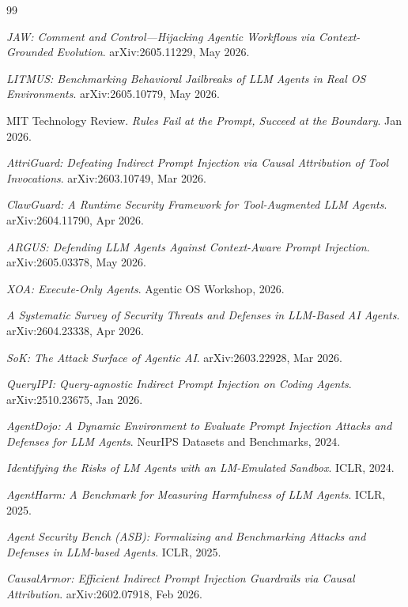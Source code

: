 \documentclass{article}
\begin{document}

\begin{thebibliography}{99}

\textit{JAW: Comment and Control---Hijacking Agentic Workflows via Context-Grounded Evolution}. arXiv:2605.11229, May 2026.

\textit{LITMUS: Benchmarking Behavioral Jailbreaks of LLM Agents in Real OS Environments}. arXiv:2605.10779, May 2026.

MIT Technology Review. \textit{Rules Fail at the Prompt, Succeed at the Boundary}. Jan 2026.

\textit{AttriGuard: Defeating Indirect Prompt Injection via Causal Attribution of Tool Invocations}. arXiv:2603.10749, Mar 2026.

\textit{ClawGuard: A Runtime Security Framework for Tool-Augmented LLM Agents}. arXiv:2604.11790, Apr 2026.

\textit{ARGUS: Defending LLM Agents Against Context-Aware Prompt Injection}. arXiv:2605.03378, May 2026.

\textit{XOA: Execute-Only Agents}. Agentic OS Workshop, 2026.

\textit{A Systematic Survey of Security Threats and Defenses in LLM-Based AI Agents}. arXiv:2604.23338, Apr 2026.

\textit{SoK: The Attack Surface of Agentic AI}. arXiv:2603.22928, Mar 2026.

\textit{QueryIPI: Query-agnostic Indirect Prompt Injection on Coding Agents}. arXiv:2510.23675, Jan 2026.

\textit{AgentDojo: A Dynamic Environment to Evaluate Prompt Injection Attacks and Defenses for LLM Agents}. NeurIPS Datasets and Benchmarks, 2024.

\textit{Identifying the Risks of LM Agents with an LM-Emulated Sandbox}. ICLR, 2024.

\textit{AgentHarm: A Benchmark for Measuring Harmfulness of LLM Agents}. ICLR, 2025.

\textit{Agent Security Bench (ASB): Formalizing and Benchmarking Attacks and Defenses in LLM-based Agents}. ICLR, 2025.

\textit{CausalArmor: Efficient Indirect Prompt Injection Guardrails via Causal Attribution}. arXiv:2602.07918, Feb 2026.


\end{thebibliography}
\end{document}
